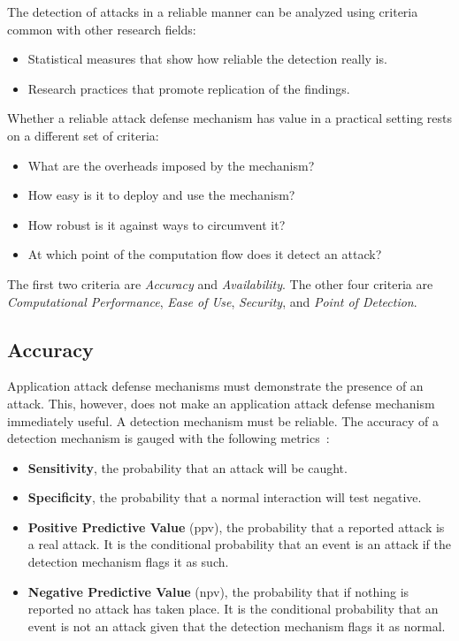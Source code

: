 \documentclass[conference]{IEEEtran}
\begin{document}
The detection of attacks in a reliable manner can be analyzed using
criteria common with other research fields:
\begin{itemize}
\item Statistical measures that show how reliable the detection really
  is.
\item Research practices that promote replication of the findings.
\end{itemize}

Whether a reliable attack defense mechanism has value in a practical
setting rests on a different set of criteria:
\begin{itemize}
\item What are the overheads imposed by the mechanism?
\item How easy is it to deploy and use the mechanism?
\item How robust is it against ways to circumvent it?
\item At which point of the computation flow does it detect an attack?
\end{itemize}

The first two criteria are \emph{Accuracy} and
\emph{Availability}. The other four criteria are \emph{Computational
  Performance}, \emph{Ease of Use}, \emph{Security}, and
\emph{Point of Detection}.

\subsection{Accuracy}
\label{ssec:diagnostic-performance}

Application attack defense mechanisms
must demonstrate the presence of an attack. This, however, does not
make an application attack defense mechanism immediately useful. A
detection mechanism must be reliable. The accuracy of a detection
mechanism is gauged with the following
metrics~\cite{TDR2013,GFDLS06,A00}:
\begin{itemize}
\item {\bf Sensitivity}, the probability that an attack will be
  caught.
\item {\bf Specificity}, the probability that a normal interaction
  will test negative.
\item {\bf Positive Predictive Value} ({\sc ppv}), the probability that a
  reported attack is a real attack. It is the conditional probability
  that an event is an attack if the detection mechanism flags it as
  such. 
\item {\bf Negative Predictive Value} ({\sc npv}), the probability that if
  nothing is reported no attack has taken place. It is the conditional
  probability that an event is not an attack given that the detection
  mechanism flags it as normal.
\end{itemize}
\end{document}
